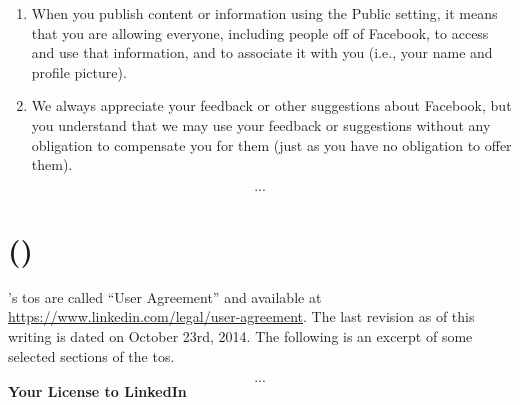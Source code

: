 \documentclass[showtrims, oldfontcommands]{kthesis}
\begin{document}
\begin{appendices}
\begin{quote_tos}
\begin{enumerate}
            \item When you publish content or information using the Public setting, it means 
            that you are allowing everyone, including people off of Facebook, to access 
            and use that information, and to associate it with you (i.e., your name and 
            profile picture).
    
            \item We always appreciate your feedback or other suggestions about Facebook, 
            but you understand that we may use your feedback or suggestions without any 
            obligation to compensate you for them (just as you have no obligation to offer 
            them).
        \end{enumerate}
        \[...\]
    \end{quote_tos}

    \section[\LinkedIn]{\LinkedIn (\LinkedInCorp)}
        \label{section:excerpts-linkedin}
    \LinkedIn's \acs{tos} are called ``User Agreement'' and available at \url{https://www.linkedin.com/legal/user-agreement}. 
    The last revision as of this writing is dated on October 23rd, 2014. The following 
    is an excerpt of some selected sections of the \ac{tos}.

    \begin{quote_tos}
        \[...\]
        \textbf{Your License to LinkedIn}
        

\end{quote_tos}
\end{appendices}
\end{document}
